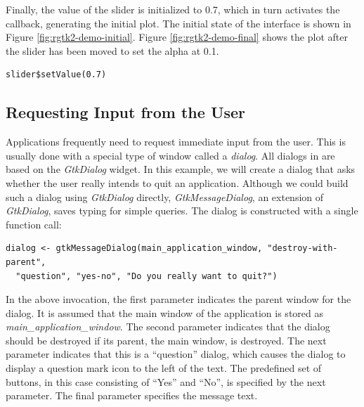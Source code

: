 \documentclass[article]{jss}
\begin{document}
Finally, the value of the slider is initialized to 0.7, which in turn
activates the callback, generating the initial plot. The initial state
of the interface is shown in Figure \ref{fig:rgtk2-demo-initial}.
Figure \ref{fig:rgtk2-demo-final} shows the plot after the slider has been
moved to set the alpha at 0.1.
\begin{verbatim}
slider$setValue(0.7)
\end{verbatim}

\subsection{Requesting Input from the User}\label{sec:dialog-example}

Applications frequently need to request immediate input from the user. This is
usually done with a special type of window called a \emph{dialog}. All dialogs
in  are based on the \emph{GtkDialog} widget. In this example,
we will create a dialog that asks whether the user really intends
to quit an application. Although we could build such a dialog using \emph{GtkDialog}
directly, \emph{GtkMessageDialog}, an extension of \emph{GtkDialog}, saves 
typing for simple queries. The dialog is constructed with a single function call:
\begin{verbatim}
dialog <- gtkMessageDialog(main_application_window, "destroy-with-parent", 
  "question", "yes-no", "Do you really want to quit?")
\end{verbatim}
In the above invocation, the first parameter indicates the parent window for
the dialog. It is assumed that the main window of the application is stored 
as \emph{main\_application\_window}. The second parameter indicates that
the dialog should be destroyed if its parent, the main window, is destroyed.
The next parameter indicates that this is a ``question'' dialog, which causes
the dialog to display a question mark icon to the left of the text. The 
predefined set of buttons, in this case consisting of ``Yes'' and ``No'', 
is specified by the next parameter. The final parameter specifies the message text.
\end{document}
